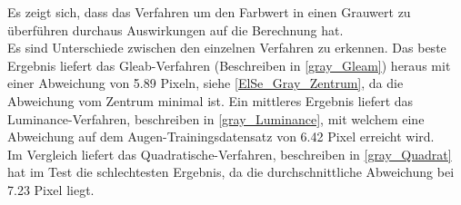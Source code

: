 Es zeigt sich, dass das Verfahren um den Farbwert in einen Grauwert zu überführen durchaus Auswirkungen auf die Berechnung hat.\\
Es sind Unterschiede zwischen den einzelnen Verfahren zu erkennen. Das beste Ergebnis liefert das Gleab-Verfahren (Beschreiben in \autoref{gray_Gleam}) heraus mit einer Abweichung von 5.89 Pixeln, siehe \autoref{ElSe_Gray_Zentrum}, da die Abweichung vom Zentrum minimal ist. Ein mittleres Ergebnis liefert das Luminance-Verfahren, beschreiben in \autoref{gray_Luminance}, mit welchem eine Abweichung auf dem Augen-Trainingsdatensatz von 6.42 Pixel erreicht wird.\\
Im Vergleich liefert das Quadratische-Verfahren, beschreiben in \autoref{gray_Quadrat} hat im Test die schlechtesten Ergebnis, da die durchschnittliche Abweichung bei 7.23 Pixel liegt.\\
